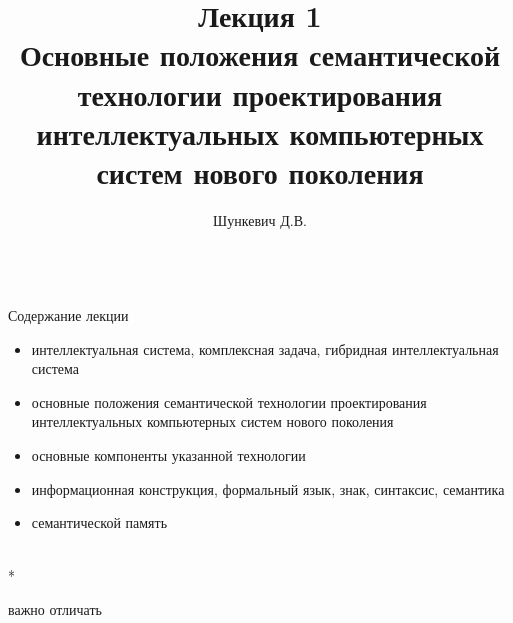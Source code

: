 
\title{Лекция 1\\Основные положения семантической технологии проектирования интеллектуальных компьютерных систем нового поколения \vspace{-2em}} 
\author[]{Шункевич Д.В.}

\begin{frame}
	\titlepage
\end{frame}

\begin{frame}{\\Содержание лекции}
	\vspace{10mm}
	\topline
	\justifying
	\begin{itemize}
		\item интеллектуальная система, комплексная задача, гибридная интеллектуальная система
		\item основные положения семантической технологии проектирования интеллектуальных компьютерных систем нового поколения
		\item основные компоненты указанной технологии
		\item информационная конструкция, формальный язык, знак, синтаксис, семантика
		\item семантической память
	\end{itemize}

\end{frame}

\begin{frame}{\\*}
	\begin{SCn}
		\begin{scnrelfromset}{важно отличать}
		\end{scnrelfromset}
	\end{SCn}
\end{frame}

